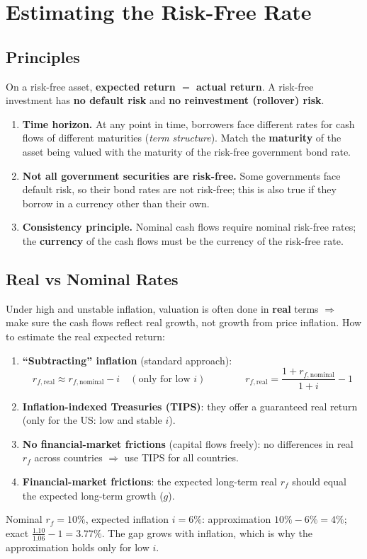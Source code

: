 \section{Estimating the Risk-Free Rate}

\subsection{Principles}
On a risk-free asset, \textbf{expected return $=$ actual return}. A risk-free investment has \textbf{no default risk} and \textbf{no reinvestment (rollover) risk}.
\begin{enumerate}
  \item \textbf{Time horizon.} At any point in time, borrowers face different rates for cash flows of different maturities (\emph{term structure}). Match the \textbf{maturity} of the asset being valued with the maturity of the risk-free government bond rate.
  \item \textbf{Not all government securities are risk-free.} Some governments face default risk, so their bond rates are not risk-free; this is also true if they borrow in a currency other than their own.
  \item \textbf{Consistency principle.} Nominal cash flows require nominal risk-free rates; the \textbf{currency} of the cash flows must be the currency of the risk-free rate.
\end{enumerate}

\subsection{Real vs Nominal Rates}
Under high and unstable inflation, valuation is often done in \textbf{real} terms $\Rightarrow$ make sure the cash flows reflect real growth, not growth from price inflation. How to estimate the real expected return:
\begin{enumerate}
  \item \textbf{``Subtracting'' inflation} (standard approach):
  \[
  r_{f,\text{real}}\approx r_{f,\text{nominal}}-i\quad(\text{only for low } i)\qquad\qquad r_{f,\text{real}}=\frac{1+r_{f,\text{nominal}}}{1+i}-1
  \]
  \item \textbf{Inflation-indexed Treasuries (TIPS)}: they offer a guaranteed real return (only for the US: low and stable $i$).
  \item \textbf{No financial-market frictions} (capital flows freely): no differences in real $r_f$ across countries $\Rightarrow$ use TIPS for all countries.
  \item \textbf{Financial-market frictions}: the expected long-term real $r_f$ should equal the expected long-term growth ($g$).
\end{enumerate}
\begin{exbox}
Nominal $r_f=10\%$, expected inflation $i=6\%$: approximation $10\%-6\%=4\%$; exact $\frac{1.10}{1.06}-1=3.77\%$. The gap grows with inflation, which is why the approximation holds only for low $i$.
\end{exbox}

